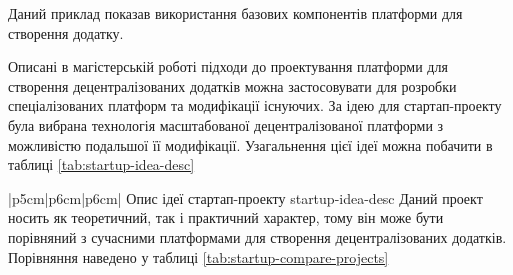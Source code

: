 \documentclass{lib/styles/default-style}
\begin{document}

    Даний приклад показав використання базових компонентів платформи для створення додатку.

    \startStartupSection

    Описані в магістерській роботі підходи до проектування платформи для створення
    децентралізованих додатків
    можна застосовувати для розробки спеціалізованих платформ та модифікації існуючих.
    За ідею для стартап-проекту була вибрана технологія масштабованої децентралізованої
    платформи з можливістю подальшої її модифікації. Узагальнення цієї ідеї
    можна побачити в таблиці \ref{tab:startup-idea-desc}

        {|p{5cm}|p{6cm}|p{6cm}|}
        {Опис ідеї стартап-проекту}
        {startup-idea-desc}
    Даний проект носить як теоретичний, так і практичний характер,
    тому він може бути порівняний з сучасними платформами для створення децентралізованих додатків.
    Порівняння наведено у таблиці \ref{tab:startup-compare-projects}
\end{document}
